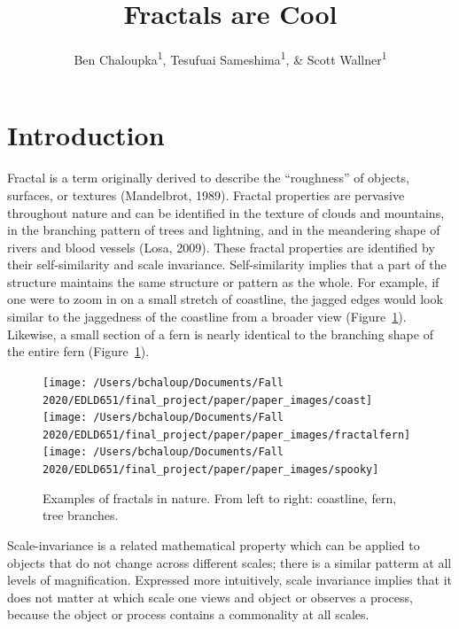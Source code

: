 \documentclass[english,jou]{apa6}
\title{Fractals are Cool}
\author{Ben Chaloupka\textsuperscript{1}, Tesufuai Sameshima\textsuperscript{1}, \& Scott Wallner\textsuperscript{1}}
\date{}
\affiliation{\vspace{0.5cm}\textsuperscript{1} University of Oregon}
\begin{document}
\maketitle

\hypertarget{introduction}{%
\section{Introduction}\label{introduction}}

Fractal is a term originally derived to describe the \enquote{roughness} of objects, surfaces, or textures (Mandelbrot, 1989). Fractal properties are pervasive throughout nature and can be identified in the texture of clouds and mountains, in the branching pattern of trees and lightning, and in the meandering shape of rivers and blood vessels (Losa, 2009). These fractal properties are identified by their self-similarity and scale invariance. Self-similarity implies that a part of the structure maintains the same structure or pattern as the whole. For example, if one were to zoom in on a small stretch of coastline, the jagged edges would look similar to the jaggedness of the coastline from a broader view (Figure~\ref{fig:examples}). Likewise, a small section of a fern is nearly identical to the branching shape of the entire fern (Figure~\ref{fig:examples}).

\begin{figure}

{\centering \texttt{[image: /Users/bchaloup/Documents/Fall 2020/EDLD651/final\_project/paper/paper\_images/coast]} \texttt{[image: /Users/bchaloup/Documents/Fall 2020/EDLD651/final\_project/paper/paper\_images/fractalfern]} \texttt{[image: /Users/bchaloup/Documents/Fall 2020/EDLD651/final\_project/paper/paper\_images/spooky]} 

}

\caption{Examples of fractals in nature. From left to right: coastline, fern, tree branches.}\label{fig:examples}
\end{figure}

Scale-invariance is a related mathematical property which can be applied to objects that do not change across different scales; there is a similar patterm at all levels of magnification. Expressed more intuitively, scale invariance implies that it does not matter at which scale one views and object or observes a process, because the object or process contains a commonality at all scales.
\end{document}

